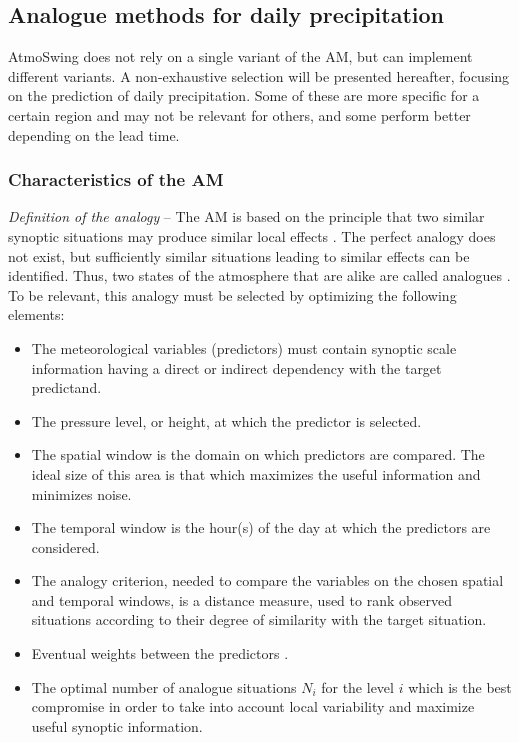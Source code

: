 \documentclass[review]{elsarticle}
\begin{document}
\subsection{Analogue methods for daily precipitation}
\label{sec:method}

AtmoSwing does not rely on a single variant of the AM, but can implement different variants. A non-exhaustive selection will be presented hereafter, focusing on the prediction of daily precipitation. Some of these are more specific for a certain region and may not be relevant for others, and some perform better depending on the lead time.


\subsubsection{Characteristics of the AM}

\textit{Definition of the analogy} -- The AM is based on the principle that two similar synoptic situations may produce similar local effects \citep{Lorenz1956}. The perfect analogy does not exist, but sufficiently similar situations leading to similar effects can be identified. Thus, two states of the atmosphere that are alike are called analogues \citep{Lorenz1969}. To be relevant, this analogy must be selected by optimizing the following elements:

\begin{itemize}		
	\item The meteorological variables (predictors) must contain synoptic scale information having a direct or indirect dependency with the target predictand.
	\item The pressure level, or height, at which the predictor is selected.
	\item The spatial window is the domain on which predictors are compared. The ideal size of this area is that which maximizes the useful information and minimizes noise.
	\item The temporal window is the hour(s) of the day at which the predictors are considered.
	\item The analogy criterion, needed to compare the variables on the chosen spatial and temporal windows, is a distance measure, used to rank observed situations according to their degree of similarity with the target situation.
	\item Eventual weights between the predictors \cite[e.g.,][]{Horton2017b, Junk2015}.
	\item The optimal number of analogue situations $N_{i}$ for the level $i$ which is the best compromise in order to take into account local variability and maximize useful synoptic information.
\end{itemize}
\end{document}
